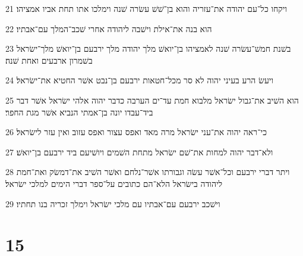 \par 21 ויקחו כל־עם יהודה את־עזריה והוא בן־שׁשׁ עשׂרה שׁנה וימלכו אתו תחת אביו אמציהו׃
\par 22 הוא בנה את־אילת וישׁבה ליהודה אחרי שׁכב־המלך עם־אבתיו׃
\par 23 בשׁנת חמשׁ־עשׂרה שׁנה לאמציהו בן־יואשׁ מלך יהודה מלך ירבעם בן־יואשׁ מלך־ישׂראל בשׁמרון ארבעים ואחת שׁנה׃
\par 24 ויעשׂ הרע בעיני יהוה לא סר מכל־חטאות ירבעם בן־נבט אשׁר החטיא את־ישׂראל׃
\par 25 הוא השׁיב את־גבול ישׂראל מלבוא חמת עד־ים הערבה כדבר יהוה אלהי ישׂראל אשׁר דבר ביד־עבדו יונה בן־אמתי הנביא אשׁר מגת החפר׃
\par 26 כי־ראה יהוה את־עני ישׂראל מרה מאד ואפס עצור ואפס עזוב ואין עזר לישׂראל׃
\par 27 ולא־דבר יהוה למחות את־שׁם ישׂראל מתחת השׁמים ויושׁיעם ביד ירבעם בן־יואשׁ׃
\par 28 ויתר דברי ירבעם וכל־אשׁר עשׂה וגבורתו אשׁר־נלחם ואשׁר השׁיב את־דמשׂק ואת־חמת ליהודה בישׂראל הלא־הם כתובים על־ספר דברי הימים למלכי ישׂראל׃
\par 29 וישׁכב ירבעם עם־אבתיו עם מלכי ישׂראל וימלך זכריה בנו תחתיו׃

\chapter{15}

